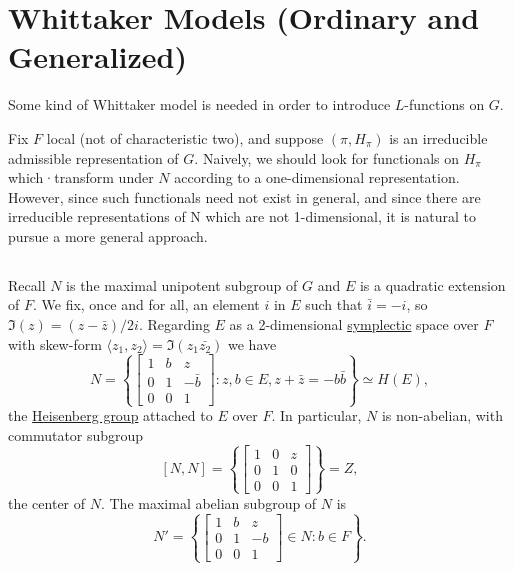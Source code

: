 \section{Whittaker Models (Ordinary and Generalized)}
\label{sec:1}


Some kind of Whittaker model is needed in order to introduce $L$-functions on $G$.

Fix $F$ local (not of characteristic two), and suppose $(\pi, H_\pi)$ is an irreducible admissible representation of $G$.
Naively, we should look for functionals on $H_\pi$ which·transform under $N$ according to a one-dimensional
representation.
However, since such functionals need not exist in general, and since there are irreducible representations of N which are not 1-dimensional, it is natural to pursue a more general approach.


\subsection{}

Recall $N$ is the maximal unipotent subgroup of $G$ and $E$ is a quadratic extension of $F$.
We fix, once and for all, an element $i$ in $E$ such that $\bar{i} = -i$, so $\Im(z) = (z - \bar{z}) / 2i$.
Regarding $E$ as a 2-dimensional \underline{symplectic} space over $F$ with skew-form $\langle z_1, z_2\rangle = \Im(z_1\bar{z_2})$ we have
\[
    N = \left\{\begin{bmatrix}1 & b& z \\ 0 & 1 & -\bar{b} \\ 0 & 0 & 1\end{bmatrix}: z, b \in E, z + \bar{z} = -b\bar{b}\right\} \simeq H(E),
\]
the \underline{Heisenberg group} attached to $E$ over $F$.
In particular, $N$ is non-abelian, with commutator subgroup
\[
    [N, N] =\left\{\begin{bmatrix} 1 & 0 & z \\ 0 & 1 & 0 \\ 0 & 0 & 1\end{bmatrix}\right\} = Z,
\]
the center of $N$.
The maximal abelian subgroup of $N$ is
\[
    N' = \left\{\begin{bmatrix} 1 & b& z \\ 0 & 1 & -b \\ 0 & 0 & 1\end{bmatrix} \in N: b \in F\right\}.
\]


